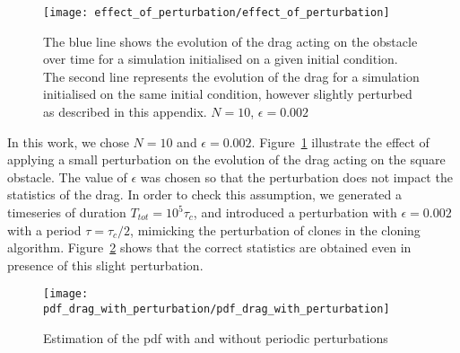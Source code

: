 \begin{figure}
  \centering
  \texttt{[image: effect\_of\_perturbation/effect\_of\_perturbation]}
  \caption[Illustration of the perturbation of the initial condition]{The blue line shows the evolution of the drag acting on the obstacle over time for a simulation initialised on a given initial condition. The second line represents the evolution of the drag for a simulation initialised on the same initial condition, however slightly perturbed as described in this appendix. $N=10$, $\epsilon=0.002$}
  \label{fig:effect_of_perturbation}
\end{figure}

In this work, we chose $N = 10$ and $\epsilon = 0.002$.
Figure~\ref{fig:effect_of_perturbation} illustrate the effect of applying a small perturbation on the evolution of the drag acting on the square obstacle.
The value of $\epsilon$ was chosen so that the perturbation does not impact the statistics of the drag.
In order to check this assumption, we generated a timeseries of duration $T_{tot} = 10^5 \tau_c$, and introduced a perturbation with $\epsilon = 0.002$ with a period $\tau = \tau_c / 2$, mimicking the perturbation of clones in the cloning algorithm.
Figure~\ref{fig:pdf_drag_with_perturbation} shows that the correct statistics are obtained even in presence of this slight perturbation.

\begin{figure}
  \centering
  \texttt{[image: pdf\_drag\_with\_perturbation/pdf\_drag\_with\_perturbation]}
  \caption{Estimation of the \ac{pdf} with and without periodic perturbations}
  \label{fig:pdf_drag_with_perturbation}
\end{figure}

